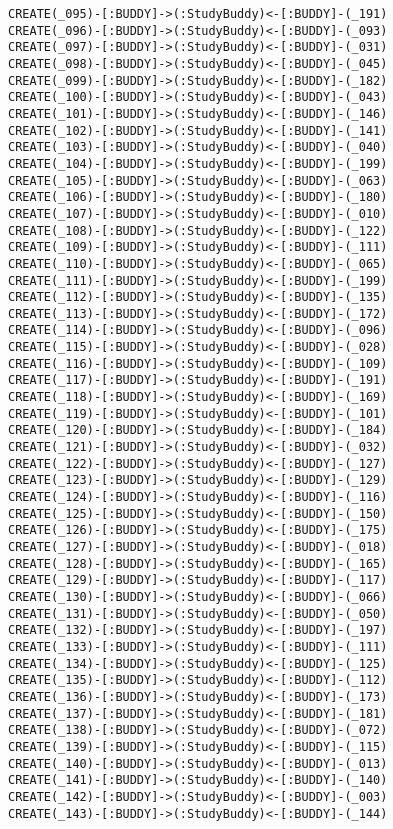 \begin{lstlisting}
CREATE(_095)-[:BUDDY]->(:StudyBuddy)<-[:BUDDY]-(_191)
CREATE(_096)-[:BUDDY]->(:StudyBuddy)<-[:BUDDY]-(_093)
CREATE(_097)-[:BUDDY]->(:StudyBuddy)<-[:BUDDY]-(_031)
CREATE(_098)-[:BUDDY]->(:StudyBuddy)<-[:BUDDY]-(_045)
CREATE(_099)-[:BUDDY]->(:StudyBuddy)<-[:BUDDY]-(_182)
CREATE(_100)-[:BUDDY]->(:StudyBuddy)<-[:BUDDY]-(_043)
CREATE(_101)-[:BUDDY]->(:StudyBuddy)<-[:BUDDY]-(_146)
CREATE(_102)-[:BUDDY]->(:StudyBuddy)<-[:BUDDY]-(_141)
CREATE(_103)-[:BUDDY]->(:StudyBuddy)<-[:BUDDY]-(_040)
CREATE(_104)-[:BUDDY]->(:StudyBuddy)<-[:BUDDY]-(_199)
CREATE(_105)-[:BUDDY]->(:StudyBuddy)<-[:BUDDY]-(_063)
CREATE(_106)-[:BUDDY]->(:StudyBuddy)<-[:BUDDY]-(_180)
CREATE(_107)-[:BUDDY]->(:StudyBuddy)<-[:BUDDY]-(_010)
CREATE(_108)-[:BUDDY]->(:StudyBuddy)<-[:BUDDY]-(_122)
CREATE(_109)-[:BUDDY]->(:StudyBuddy)<-[:BUDDY]-(_111)
CREATE(_110)-[:BUDDY]->(:StudyBuddy)<-[:BUDDY]-(_065)
CREATE(_111)-[:BUDDY]->(:StudyBuddy)<-[:BUDDY]-(_199)
CREATE(_112)-[:BUDDY]->(:StudyBuddy)<-[:BUDDY]-(_135)
CREATE(_113)-[:BUDDY]->(:StudyBuddy)<-[:BUDDY]-(_172)
CREATE(_114)-[:BUDDY]->(:StudyBuddy)<-[:BUDDY]-(_096)
CREATE(_115)-[:BUDDY]->(:StudyBuddy)<-[:BUDDY]-(_028)
CREATE(_116)-[:BUDDY]->(:StudyBuddy)<-[:BUDDY]-(_109)
CREATE(_117)-[:BUDDY]->(:StudyBuddy)<-[:BUDDY]-(_191)
CREATE(_118)-[:BUDDY]->(:StudyBuddy)<-[:BUDDY]-(_169)
CREATE(_119)-[:BUDDY]->(:StudyBuddy)<-[:BUDDY]-(_101)
CREATE(_120)-[:BUDDY]->(:StudyBuddy)<-[:BUDDY]-(_184)
CREATE(_121)-[:BUDDY]->(:StudyBuddy)<-[:BUDDY]-(_032)
CREATE(_122)-[:BUDDY]->(:StudyBuddy)<-[:BUDDY]-(_127)
CREATE(_123)-[:BUDDY]->(:StudyBuddy)<-[:BUDDY]-(_129)
CREATE(_124)-[:BUDDY]->(:StudyBuddy)<-[:BUDDY]-(_116)
CREATE(_125)-[:BUDDY]->(:StudyBuddy)<-[:BUDDY]-(_150)
CREATE(_126)-[:BUDDY]->(:StudyBuddy)<-[:BUDDY]-(_175)
CREATE(_127)-[:BUDDY]->(:StudyBuddy)<-[:BUDDY]-(_018)
CREATE(_128)-[:BUDDY]->(:StudyBuddy)<-[:BUDDY]-(_165)
CREATE(_129)-[:BUDDY]->(:StudyBuddy)<-[:BUDDY]-(_117)
CREATE(_130)-[:BUDDY]->(:StudyBuddy)<-[:BUDDY]-(_066)
CREATE(_131)-[:BUDDY]->(:StudyBuddy)<-[:BUDDY]-(_050)
CREATE(_132)-[:BUDDY]->(:StudyBuddy)<-[:BUDDY]-(_197)
CREATE(_133)-[:BUDDY]->(:StudyBuddy)<-[:BUDDY]-(_111)
CREATE(_134)-[:BUDDY]->(:StudyBuddy)<-[:BUDDY]-(_125)
CREATE(_135)-[:BUDDY]->(:StudyBuddy)<-[:BUDDY]-(_112)
CREATE(_136)-[:BUDDY]->(:StudyBuddy)<-[:BUDDY]-(_173)
CREATE(_137)-[:BUDDY]->(:StudyBuddy)<-[:BUDDY]-(_181)
CREATE(_138)-[:BUDDY]->(:StudyBuddy)<-[:BUDDY]-(_072)
CREATE(_139)-[:BUDDY]->(:StudyBuddy)<-[:BUDDY]-(_115)
CREATE(_140)-[:BUDDY]->(:StudyBuddy)<-[:BUDDY]-(_013)
CREATE(_141)-[:BUDDY]->(:StudyBuddy)<-[:BUDDY]-(_140)
CREATE(_142)-[:BUDDY]->(:StudyBuddy)<-[:BUDDY]-(_003)
CREATE(_143)-[:BUDDY]->(:StudyBuddy)<-[:BUDDY]-(_144)

\end{lstlisting}
